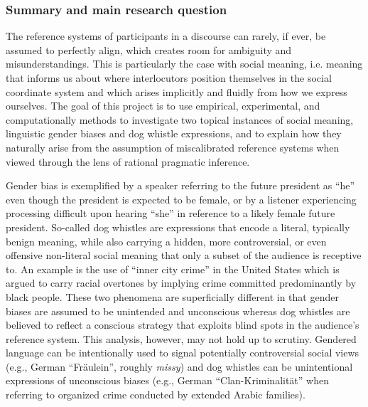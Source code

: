 \documentclass[11pt]{article}
\begin{document}

\subsubsection{Summary and main research question}

The reference systems of participants in a discourse can rarely, if ever, be assumed to perfectly align, which creates room for ambiguity and misunderstandings.  This is particularly the case with social meaning, i.e. meaning that informs us about where interlocutors position themselves in the social coordinate system and which arises implicitly and fluidly from how we express ourselves.  The goal of this project is to use empirical, experimental, and computationally methods to investigate two topical instances of social meaning, linguistic gender biases and dog whistle expressions, and to explain how they naturally arise from the assumption of miscalibrated reference systems when viewed through the lens of rational pragmatic inference.

Gender bias is exemplified by a speaker referring to the future president as “he” even though the president is expected to be female, or by a listener experiencing processing difficult upon hearing “she” in reference to a likely female future president.  So-called dog whistles are expressions that encode a literal, typically benign meaning, while also carrying a hidden, more controversial, or even offensive non-literal social meaning that only a subset of the audience is receptive to.  An example is the use of “inner city crime” in the United States which is argued to carry racial overtones by implying crime committed predominantly by black people.  These two phenomena are superficially different in that gender biases are assumed to be unintended and unconscious whereas dog whistles are believed to reflect a conscious strategy that exploits blind spots in the audience’s reference system.  This analysis, however, may not hold up to scrutiny.  Gendered language can be intentionally used to signal potentially controversial social views (e.g., German “Fräulein”, roughly \textit{missy}) and dog whistles can be unintentional expressions of unconscious biases (e.g., German “Clan-Kriminalität” when referring to organized crime conducted by extended Arabic families).
\end{document}
